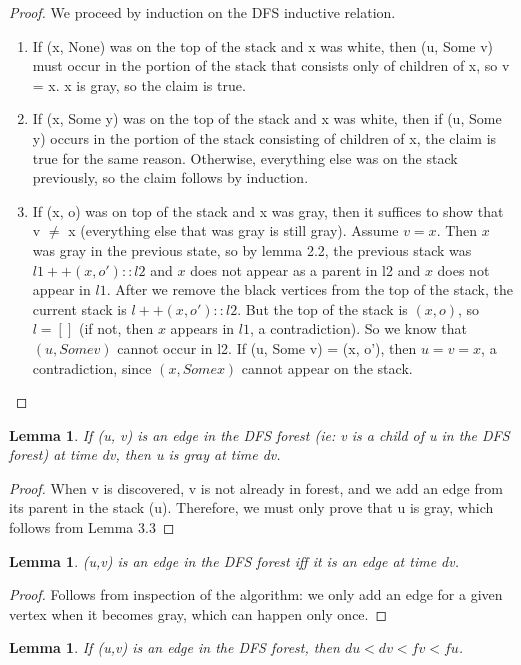 \documentclass{article}
\newtheorem{lemma}[theorem]{Lemma}
\begin{document}
\begin{proof}
We proceed by induction on the DFS inductive relation.
\begin{enumerate}
\item
If (x, None) was on the top of the stack and x was white, then (u, Some v) must occur in the portion of the stack that consists only of children of x, so v = x. x is gray, so the claim is true.
\item
If (x, Some y) was on the top of the stack and x was white, then if (u, Some y) occurs in the portion of the stack consisting of children of x, the claim is true for the same reason. Otherwise, everything else was on the stack previously, so the claim follows by induction.
\item
If (x, o) was on top of the stack and x was gray, then it suffices to show that v $\neq$ x (everything else that was gray is still gray). Assume $v=x$. Then $x$ was gray in the previous state, so by lemma 2.2, the previous stack was $l1 ++ (x, o') :: l2$ and $x$ does not appear as a parent in l2 and $x$ does not appear in $l1$. After we remove the black vertices from the top of the stack, the current stack is $l ++ (x, o') :: l2$. But the top of the stack is $(x, o)$, so $l=[]$ (if not, then $x$ appears in $l1$, a contradiction). So we know that $(u, Some v)$ cannot occur in l2. If (u, Some v) = (x, o'), then $u=v=x$, a contradiction, since $(x, Some x)$ cannot appear on the stack.
\end{enumerate}
\end{proof}
\begin{lemma}
If (u, v) is an edge in the DFS forest (ie: v is a child of u in the DFS forest) at time dv, then u is gray at time dv.
\end{lemma}
\begin{proof}
When v is discovered, v is not already in forest, and we add an edge from its parent in the stack (u). Therefore, we must only prove that u is gray, which follows from Lemma 3.3 
\end{proof}
\begin{lemma}
(u,v) is an edge in the DFS forest iff it is an edge at time dv.
\end{lemma}
\begin{proof}
Follows from inspection of the algorithm: we only add an edge for a given vertex when it becomes gray, which can happen only once.
\end{proof}
\begin{lemma}
If (u,v) is an edge in the DFS forest, then $du < dv < fv < fu$.
\end{lemma}
\end{document}
